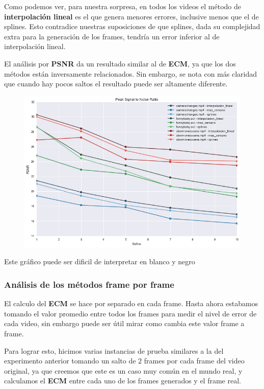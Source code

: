 Como podemos ver, para nuestra sorpresa, en todos los videos el m\'etodo de \textbf{interpolaci\'on
lineal} es el que genera menores errores, inclusive menos que el de splines. Esto contradice nuestras
suposiciones de que splines, dada su complejidad extra para la generaci\'on de los frames, tendr\'ia 
un error inferior al de interpolaci\'on lineal.

El an\'alisis por \textbf{PSNR} da un resultado similar al de \textbf{ECM}, ya
que los dos m\'etodos est\'an inversamente relacionados. Sin embargo, se nota
con m\'as claridad que cuando hay pocos saltos el resultado puede ser altamente
diferente.

\begin{figure}[H]
\centering
\includegraphics[width=.95\textwidth]{graficos/psnr.png}
\end{figure}
\vspace{-2em}
\begin{tiny}Este gr\'afico puede ser dificil de interpretar en blanco y negro\end{tiny}
\vspace{2em}

\subsubsection{An\'alisis de los m\'etodos frame por frame}

El calculo del \textbf{ECM} se hace por separado en cada frame. Hasta ahora
estabamos tomando el valor promedio entre todos los frames para medir el nivel
de error de cada video, sin embargo puede ser \'util mirar como cambia este
valor frame a frame.

Para lograr esto, hicimos varias instancias de prueba similares a la del
experimento anterior tomando un salto de \(2\) frames por cada frame del
video original, ya que creemos que este es un caso muy com\'un en el mundo real,
y calculamos el \textbf{ECM} entre cada uno de los frames generados y el frame
real.

